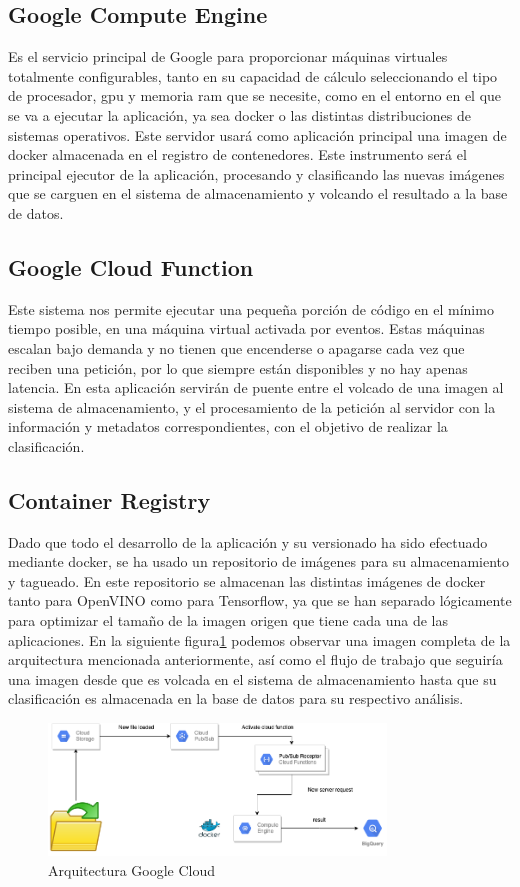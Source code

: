 \subsection{Google Compute Engine}\label{subsec:computeengine}
Es el servicio principal de Google para proporcionar máquinas virtuales totalmente configurables, tanto en su capacidad de cálculo seleccionando el tipo de procesador, gpu y memoria ram que se necesite, como en el entorno
en el que se va a ejecutar la aplicación, ya sea docker o las distintas distribuciones de sistemas operativos.
Este servidor usará como aplicación principal una imagen de docker almacenada en el registro de contenedores.
Este instrumento será el principal ejecutor de la aplicación, procesando y clasificando las nuevas imágenes que se carguen en el sistema de almacenamiento y volcando el resultado a la base de datos.
\subsection{Google Cloud Function}\label{subsec:cloudfunction}
Este sistema nos permite ejecutar una pequeña porción de código en el mínimo tiempo posible, en una máquina virtual activada por eventos.
Estas máquinas escalan bajo demanda y no tienen que encenderse o apagarse cada vez que reciben una petición, por lo que siempre están disponibles y no hay apenas latencia.
En esta aplicación servirán de puente entre el volcado de una imagen al sistema de almacenamiento, y el procesamiento de la petición al servidor con la información y metadatos correspondientes, con el objetivo de realizar la clasificación.
\subsection{Container Registry}\label{subsec:container-registry}
Dado que todo el desarrollo de la aplicación y su versionado ha sido efectuado mediante docker, se ha usado un repositorio de imágenes para su almacenamiento y tagueado.
En este repositorio se almacenan las distintas imágenes de docker tanto para OpenVINO como para Tensorflow, ya que se han separado lógicamente para optimizar el tamaño de la imagen origen que tiene cada una de las aplicaciones.
En la siguiente figura\ref{fig:Arquitectura Google Cloud} podemos observar una imagen completa de la arquitectura mencionada anteriormente, así como el flujo de trabajo que seguiría una imagen desde que es volcada en el sistema de almacenamiento hasta que su clasificación es almacenada en la base de datos para su respectivo análisis.
\begin{figure}
    \centering
    \includegraphics[width=0.8\textwidth]{images/chapter4/cloud_architecture.png}
    \caption{Arquitectura Google Cloud}
    \label{fig:Arquitectura Google Cloud}
\end{figure}

